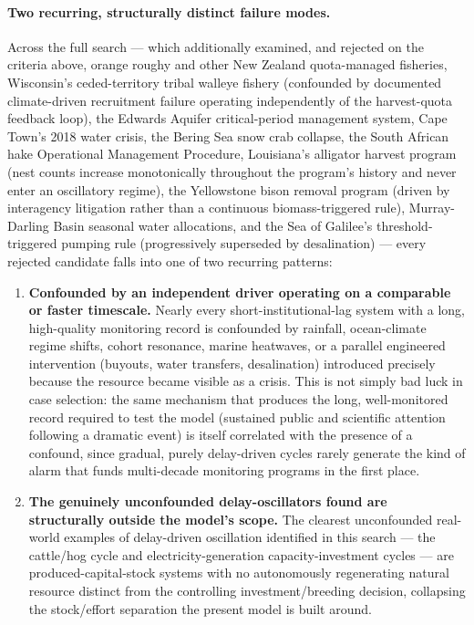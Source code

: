 \documentclass[twocolumn,10pt]{article}
\begin{document}
\paragraph{Two recurring, structurally distinct failure modes.} Across the full search --- which additionally examined, and rejected on the criteria above, orange roughy and other New Zealand quota-managed fisheries, Wisconsin's ceded-territory tribal walleye fishery (confounded by documented climate-driven recruitment failure \cite{hansen2018} operating independently of the harvest-quota feedback loop), the Edwards Aquifer critical-period management system, Cape Town's 2018 water crisis, the Bering Sea snow crab collapse, the South African hake Operational Management Procedure, Louisiana's alligator harvest program (nest counts increase monotonically throughout the program's history and never enter an oscillatory regime), the Yellowstone bison removal program (driven by interagency litigation rather than a continuous biomass-triggered rule), Murray-Darling Basin seasonal water allocations, and the Sea of Galilee's threshold-triggered pumping rule (progressively superseded by desalination) --- every rejected candidate falls into one of two recurring patterns:
\begin{enumerate}
\item \textbf{Confounded by an independent driver operating on a comparable or faster timescale.} Nearly every short-institutional-lag system with a long, high-quality monitoring record is confounded by rainfall, ocean-climate regime shifts, cohort resonance, marine heatwaves, or a parallel engineered intervention (buyouts, water transfers, desalination) introduced precisely because the resource became visible as a crisis. This is not simply bad luck in case selection: the same mechanism that produces the long, well-monitored record required to test the model (sustained public and scientific attention following a dramatic event) is itself correlated with the presence of a confound, since gradual, purely delay-driven cycles rarely generate the kind of alarm that funds multi-decade monitoring programs in the first place.
\item \textbf{The genuinely unconfounded delay-oscillators found are structurally outside the model's scope.} The clearest unconfounded real-world examples of delay-driven oscillation identified in this search --- the cattle/hog cycle \cite{rosen1994} and electricity-generation capacity-investment cycles --- are produced-capital-stock systems with no autonomously regenerating natural resource distinct from the controlling investment/breeding decision, collapsing the stock/effort separation the present model is built around.
\end{enumerate}
\end{document}
